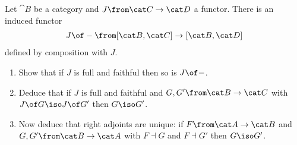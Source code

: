 \begin{exercise}
  Let $\cat B$ be a category and $J\from\cat C\to\cat D$ a functor. There is an induced functor
  \begin{align*}
    J\of -\from[\cat B,\cat C]\to [\cat B,\cat D]
  \end{align*}
  defined by composition with $J$.
  \begin{enumerate}
  \item Show that if $J$ is full and faithful then so is $J\of -$.
  \item Deduce that if $J$ is full and faithful and $G,G'\from\cat B\to\cat C$ with $J\of G\iso J\of G'$ then $G\iso G'$.
  \item Now deduce that right adjoints are unique: if $F\from \cat A\to\cat B$ and $G,G'\from\cat B\to \cat A$ with $F\dashv G$ and $F\dashv G'$ then $G\iso G'$. 
  \end{enumerate}
\end{exercise}
